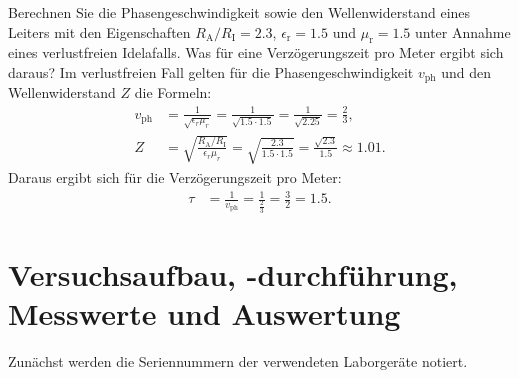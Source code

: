 \documentclass[ngerman]{scrartcl}
\theoremstyle{definition}
\begin{document}
		\begin{voraufgabe}{Berechnen Sie die Phasengeschwindigkeit sowie den Wellenwiderstand eines Leiters mit den Eigenschaften $R_\mathrm{A}/R_\mathrm{I} = 2.3$, $\epsilon_\mathrm{r} = 1.5$ und $\mu_\mathrm{r} = 1.5$ unter Annahme eines verlustfreien Idelafalls. Was für eine Verzögerungszeit pro Meter ergibt sich daraus?}
			Im verlustfreien Fall gelten für die Phasengeschwindigkeit $v_\mathrm{ph}$ und den Wellenwiderstand $Z$ die Formeln:
			\begin{align*}
				v_\mathrm{ph} &= \frac{1}{\sqrt{\epsilon_r \mu_r}} = \frac{1}{\sqrt{1.5 \cdot 1.5}} = \frac{1}{\sqrt{2.25}} = \frac{2}{3},\\
				Z &= \sqrt{\frac{R_\mathrm{A}/R_\mathrm{I}}{\epsilon_r \mu_r}} = \sqrt{\frac{2.3}{1.5 \cdot 1.5}} = \frac{\sqrt{2.3}}{1.5} \approx 1.01.
			\end{align*}
			Daraus ergibt sich für die Verzögerungszeit pro Meter:
			\begin{align*}
				\tau &= \frac{1}{v_\mathrm{ph}} = \frac{1}{\frac{2}{3}} = \frac{3}{2} =1.5.
			\end{align*}
			
		\end{voraufgabe}

\clearpage

	\section{Versuchsaufbau, -durchführung, Messwerte und Auswertung}
		Zunächst werden die Seriennummern der verwendeten Laborgeräte notiert.
		
		
		
\end{document}
